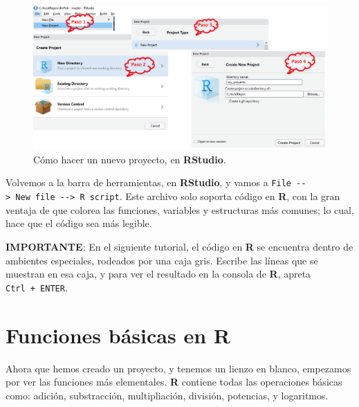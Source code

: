 \documentclass[12pt,letterpaper,]{book}
\begin{document}
\begin{figure}[thb!]

{\centering \includegraphics[width=0.95\linewidth]{figuras/RStudioNewProject} 

}

\caption{Cómo hacer un nuevo proyecto, en \textbf{RStudio}.}\label{fig:RStudioNewProject}
\end{figure}

Volvemos a la barra de herramientas, en \textbf{RStudio}, y vamos a
\texttt{File\ -\/-\textgreater{}\ New\ file\ -\/-\textgreater{}\ R\ script}.
Este archivo solo soporta código en \textbf{R}, con la gran ventaja de
que colorea las funciones, variables y estructuras más comunes; lo cual,
hace que el código sea más legible.

\textbf{IMPORTANTE}: En el siguiente tutorial, el código en \textbf{R}
se encuentra dentro de ambientes especiales, rodeados por una caja gris.
Escribe las líneas que se muestran en esa caja, y para ver el resultado
en la consola de \textbf{R}, apreta \texttt{Ctrl\ +\ ENTER}.

\section{Funciones básicas en R}\label{funciones-basicas-en-r}

Ahora que hemos creado un proyecto, y tenemos un lienzo en blanco,
empezamos por ver las funciones más elementales. \textbf{R} contiene
todas las operaciones básicas como: adición, substracción,
multipliación, división, potencias, y logaritmos.
\end{document}
